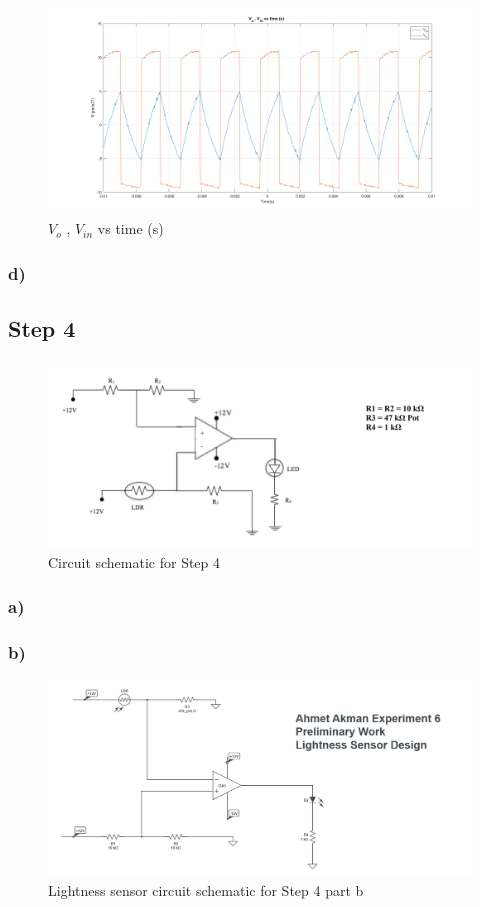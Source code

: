 \documentclass[letterpaper,12pt]{article}
\begin{document}
\begin{figure}[H]
	\centering
   \includegraphics[width=1\textwidth]{3c_2.png}
   \caption{\(V_{o}\) , \(V_{in}\) vs time (s) }
\end{figure}
\subsubsection{d)}

\subsection{Step 4}
\begin{figure}[H]
	\centering
   \includegraphics[width=1\textwidth]{darkness.png}
   \caption{Circuit schematic for Step 4}
\end{figure}
\subsubsection{a)}

\subsubsection{b)}
\begin{figure}[H]
	\centering
   \includegraphics[width=1\textwidth]{lightness.png}
   \caption{Lightness sensor circuit schematic for Step 4 part b}
\end{figure}
\end{document}
